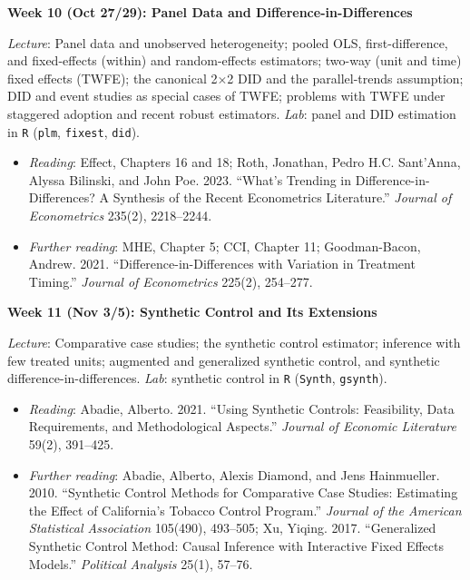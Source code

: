 \documentclass[12pt]{article}
\begin{document}
\vspace{0.8em} \noindent \textbf{\textcolor{titlecolor}{Week 10 (Oct 27/29): Panel Data and Difference-in-Differences}}

\noindent \textit{Lecture}: Panel data and unobserved heterogeneity; pooled OLS, first-difference, and fixed-effects (within) and random-effects estimators; two-way (unit and time) fixed effects (TWFE); the canonical 2$\times$2 DID and the parallel-trends assumption; DID and event studies as special cases of TWFE; problems with TWFE under staggered adoption and recent robust estimators. \textit{Lab}: panel and DID estimation in \texttt{R} (\texttt{plm}, \texttt{fixest}, \texttt{did}).
\begin{itemize}[noitemsep, topsep=2pt]
    \item \textit{Reading}: Effect, Chapters 16 and 18; Roth, Jonathan, Pedro H.C. Sant'Anna, Alyssa Bilinski, and John Poe. 2023. ``What's Trending in Difference-in-Differences? A Synthesis of the Recent Econometrics Literature.'' \textit{Journal of Econometrics} 235(2), 2218--2244.
    \item \textit{Further reading}: MHE, Chapter 5; CCI, Chapter 11; Goodman-Bacon, Andrew. 2021. ``Difference-in-Differences with Variation in Treatment Timing.'' \textit{Journal of Econometrics} 225(2), 254--277.
\end{itemize}

\vspace{0.8em} \noindent \textbf{\textcolor{titlecolor}{Week 11 (Nov 3/5): Synthetic Control and Its Extensions}}

\noindent \textit{Lecture}: Comparative case studies; the synthetic control estimator; inference with few treated units; augmented and generalized synthetic control, and synthetic difference-in-differences. \textit{Lab}: synthetic control in \texttt{R} (\texttt{Synth}, \texttt{gsynth}).
\begin{itemize}[noitemsep, topsep=2pt]
    \item \textit{Reading}: Abadie, Alberto. 2021. ``Using Synthetic Controls: Feasibility, Data Requirements, and Methodological Aspects.'' \textit{Journal of Economic Literature} 59(2), 391--425.
    \item \textit{Further reading}: Abadie, Alberto, Alexis Diamond, and Jens Hainmueller. 2010. ``Synthetic Control Methods for Comparative Case Studies: Estimating the Effect of California's Tobacco Control Program.'' \textit{Journal of the American Statistical Association} 105(490), 493--505; Xu, Yiqing. 2017. ``Generalized Synthetic Control Method: Causal Inference with Interactive Fixed Effects Models.'' \textit{Political Analysis} 25(1), 57--76.
\end{itemize}
\end{document}
